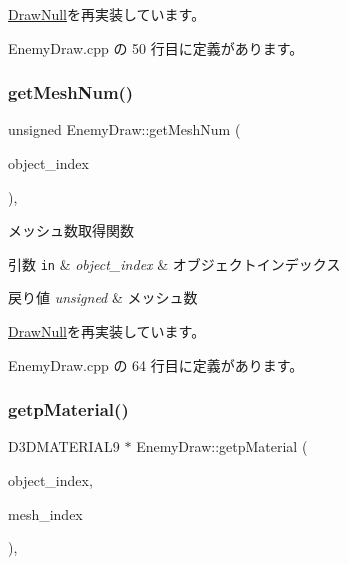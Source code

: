 \mbox{\hyperlink{class_draw_null_a72ac0b7dc40b1469582419dcc5b0e114}{Draw\+Null}}を再実装しています。



 Enemy\+Draw.\+cpp の 50 行目に定義があります。

\mbox{\label{class_enemy_draw_a1d8a943e4b625795bbd5ae614cc38ed1}} 
\subsubsection{\texorpdfstring{get\+Mesh\+Num()}{getMeshNum()}}
{\footnotesize\ttfamily unsigned Enemy\+Draw\+::get\+Mesh\+Num (\begin{DoxyParamCaption}\item[{unsigned}]{object\+\_\+index }\end{DoxyParamCaption})\hspace{0.3cm}{\ttfamily [override]}, {\ttfamily [virtual]}}



メッシュ数取得関数 


\begin{DoxyParams}[1]{引数}
\mbox{\tt in}  & {\em object\+\_\+index} & オブジェクトインデックス \\
\hline
\end{DoxyParams}

\begin{DoxyRetVals}{戻り値}
{\em unsigned} & メッシュ数 \\
\hline
\end{DoxyRetVals}


\mbox{\hyperlink{class_draw_null_a4c566a37d27fac3dcf76c7970443f375}{Draw\+Null}}を再実装しています。



 Enemy\+Draw.\+cpp の 64 行目に定義があります。

\mbox{\label{class_enemy_draw_a3f2885da84533364daaaac4a801fbc46}} 
\subsubsection{\texorpdfstring{getp\+Material()}{getpMaterial()}}
{\footnotesize\ttfamily D3\+D\+M\+A\+T\+E\+R\+I\+A\+L9 $\ast$ Enemy\+Draw\+::getp\+Material (\begin{DoxyParamCaption}\item[{unsigned}]{object\+\_\+index,  }\item[{unsigned}]{mesh\+\_\+index }\end{DoxyParamCaption})\hspace{0.3cm}{\ttfamily [override]}, {\ttfamily [virtual]}}



